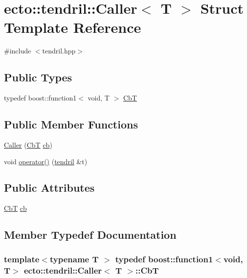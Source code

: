 \hypertarget{structecto_1_1tendril_1_1Caller}{\section{ecto\-:\-:tendril\-:\-:Caller$<$ T $>$ Struct Template Reference}
\label{structecto_1_1tendril_1_1Caller}
}


{\ttfamily \#include $<$tendril.\-hpp$>$}

\subsection*{Public Types}
\begin{DoxyCompactItemize}
\item 
typedef boost\-::function1$<$ void, T $>$ \hyperlink{structecto_1_1tendril_1_1Caller_a846333ac5c22cfb6eafb1c2240c0c623}{Cb\-T}
\end{DoxyCompactItemize}
\subsection*{Public Member Functions}
\begin{DoxyCompactItemize}
\item 
\hyperlink{structecto_1_1tendril_1_1Caller_a84b71a5526ff59dcbd6cb7a102f8d9db}{Caller} (\hyperlink{structecto_1_1tendril_1_1Caller_a846333ac5c22cfb6eafb1c2240c0c623}{Cb\-T} \hyperlink{structecto_1_1tendril_1_1Caller_afecdbc09ca504c16292a6365ab1cd950}{cb})
\item 
void \hyperlink{structecto_1_1tendril_1_1Caller_a19099e68a2059823575e71f45b2c0b20}{operator()} (\hyperlink{classecto_1_1tendril}{tendril} \&t)
\end{DoxyCompactItemize}
\subsection*{Public Attributes}
\begin{DoxyCompactItemize}
\item 
\hyperlink{structecto_1_1tendril_1_1Caller_a846333ac5c22cfb6eafb1c2240c0c623}{Cb\-T} \hyperlink{structecto_1_1tendril_1_1Caller_afecdbc09ca504c16292a6365ab1cd950}{cb}
\end{DoxyCompactItemize}


\subsection{Member Typedef Documentation}
\hypertarget{structecto_1_1tendril_1_1Caller_a846333ac5c22cfb6eafb1c2240c0c623}{
\subsubsection[{Cb\-T}]{\setlength{\rightskip}{0pt plus 5cm}template$<$typename T $>$ typedef boost\-::function1$<$void, T$>$ {\bf ecto\-::tendril\-::\-Caller}$<$ T $>$\-::{\bf Cb\-T}}}\label{structecto_1_1tendril_1_1Caller_a846333ac5c22cfb6eafb1c2240c0c623}


